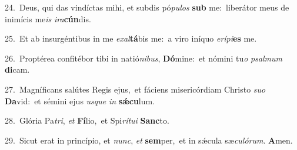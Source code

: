 {\numbfont\textcolor{\numbcolor}{24.}}~Deus, qui das vindíctas mihi, et subdis pó\-\textit{pu}\-\textit{los} \textbf{sub} me:~\star liberátor meus de inimícis me\textit{is} \textit{i}\-\textit{ra}\textbf{cún}dis.\par
{\numbfont\textcolor{\numbcolor}{25.}}~Et ab insurgéntibus in me \textit{ex}\-\textit{al}\textbf{tá}bis me:~\star a viro iníquo \textit{e}\-\textit{rí}\textit{pi}\textbf{es} me.\par
{\numbfont\textcolor{\numbcolor}{26.}}~Proptérea confitébor tibi in natió\-\textit{ni}\-\textit{bus}, \textbf{Dó}\-mine:~\star et nómini tu\textit{o} \textit{psal}\-\textit{mum} \textbf{di}\-cam.\par
{\numbfont\textcolor{\numbcolor}{27.}}~Magníficans salútes Regis ejus,~\dagger et fáciens misericórdiam Christo \textit{su}\-\textit{o} \textbf{Da}\-vid:~\star et sémini ejus \textit{us}\-\textit{que} \textit{in} \textbf{sǽ}\-\textbf{cu}lum.\par
{\numbfont\textcolor{\numbcolor}{28.}}~Glória Pa\-\textit{tri}\-, \textit{et} \textbf{Fí}\-lio,~\star et Spi\-\textit{rí}\-\textit{tu}\textit{i} \textbf{Sanc}\-to.\par
{\numbfont\textcolor{\numbcolor}{29.}}~Sicut erat in princípio, et \textit{nunc}\-, \textit{et} \textbf{sem}\-per,~\star et in sǽcula sæ\-\textit{cu}\-\textit{ló}\textit{rum}. \textbf{A}\-men.\par
